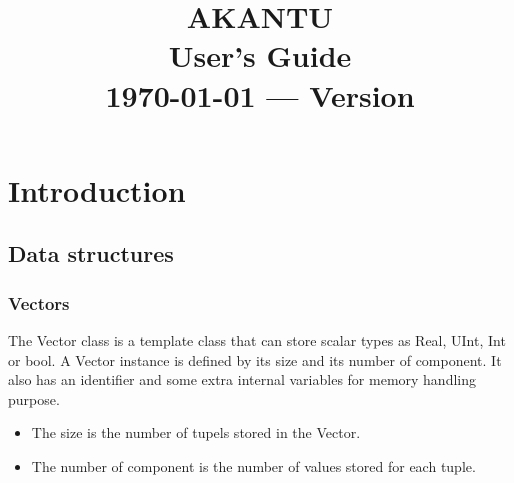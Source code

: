 \documentclass[a4paper,11pt]{book}
\title{\textbf{\Huge AKANTU}\\
  \vspace{0.5cm}
  \textbf{\huge User's Guide}\\
  \vspace{1cm}
  {\small \today{} --- Version \version}
}
\date{}
\begin{document}
\maketitle

\tableofcontents

\chapter{Introduction}

\section{Data structures\label{chap:data-structure}}

\subsection{Vectors\label{sec:vectors}}

The Vector class is a template class  that can store scalar types as Real, UInt,
Int  or bool.   A Vector  instance is  defined  by its  size and  its number  of
component.  It also  has an  identifier and  some extra  internal  variables for
memory handling purpose.

\begin{itemize}
\item The size is the number of tupels stored in the Vector.
\item The number of component is the number of values stored for each tuple.
\end{itemize}
\end{document}
